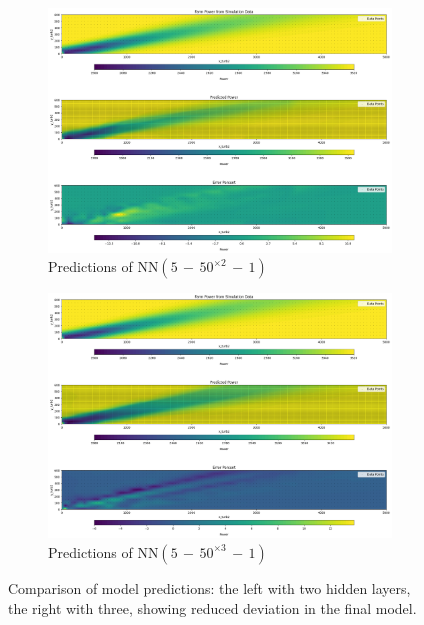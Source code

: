 \documentclass[preprint,12pt]{elsarticle}
\begin{document}
\begin{figure}[h]
	\centering
	\begin{subfigure}[b]{0.49\textwidth}
		\includegraphics[width=\textwidth]{../figures/optimization/prob_model_colormap.png}
		\caption{Predictions of $\text{NN}(5\,{-}\,50^{\times2}\,{-}\,1)$}
		\label{fig:prob_model_colormap}
	\end{subfigure}
	\hfill
	\begin{subfigure}[b]{0.49\textwidth}
		\includegraphics[width=\textwidth]{../figures/optimization/prob_model_colormap_2.png}
		\caption{Predictions of $\text{NN}(5\,{-}\,50^{\times3}\,{-}\,1)$}
		\label{fig:prob_model_colormap_2}
	\end{subfigure}
	\caption{Comparison of model predictions: the left with two hidden layers, the right with three, showing reduced deviation in the final model.}
	\label{fig:prob_model_comparison}
\end{figure}
\end{document}
